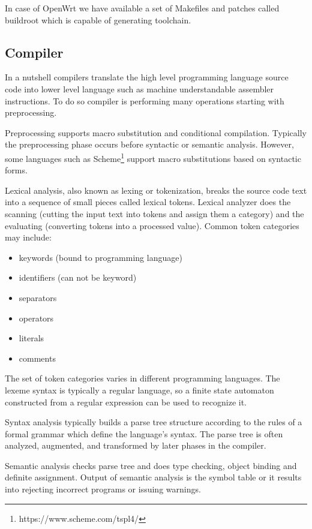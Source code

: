 In case of OpenWrt we have available a set of Makefiles and patches called buildroot which is capable of generating toolchain.



\subsection{Compiler}

In a nutshell compilers translate the high level programming language source code into lower level language such as machine understandable assembler instructions.
To do so compiler is performing many operations starting with preprocessing.

Preprocessing supports macro substitution and conditional compilation.
Typically the preprocessing phase occurs before syntactic or semantic analysis.
However, some languages such as Scheme\footnote{https://www.scheme.com/tspl4/} support macro substitutions based on syntactic forms.

Lexical analysis, also known as lexing or tokenization, breaks the source code text into a sequence of small pieces called lexical tokens.
Lexical analyzer does the scanning (cutting the input text into tokens and assign them a category) and the evaluating (converting tokens into a processed value).
Common token categories may include:
\begin{itemize}
    \item keywords (bound to programming language)
    \item identifiers (can not be keyword)
    \item separators
    \item operators
    \item literals
    \item comments
\end{itemize}
The set of token categories varies in different programming languages.
The lexeme syntax is typically a regular language, so a finite state automaton constructed from a regular expression can be used to recognize it.

Syntax analysis typically builds a parse tree structure according to the rules of a formal grammar which define the language's syntax.
The parse tree is often analyzed, augmented, and transformed by later phases in the compiler.

Semantic analysis checks parse tree and does type checking, object binding and definite assignment.
Output of semantic analysis is the symbol table or it results into rejecting incorrect programs or issuing warnings.


